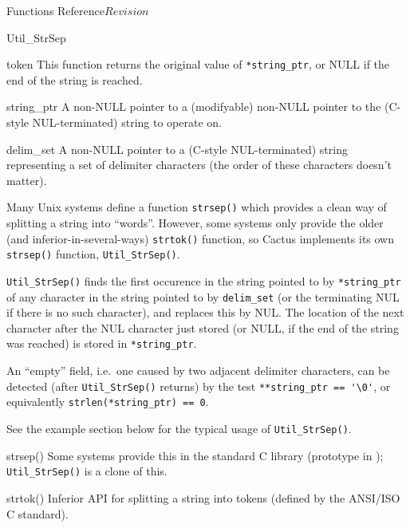 \begin{cactuspart}{ Functions Reference}{}{$Revision$}
\begin{FunctionDescription}{Util\_StrSep}
\begin{ResultSection}
\begin{Result}{token}
This function returns the original value of \verb|*string_ptr|,
or NULL if the end of the string is reached.
\end{Result}
\end{ResultSection}

\begin{ParameterSection}
\begin{Parameter}{string\_ptr}
A non-NULL pointer to a (modifyable) non-NULL pointer to the
(C-style NUL-terminated) string to operate on.
\end{Parameter}
\begin{Parameter}{delim\_set}
A non-NULL pointer to a (C-style NUL-terminated) string representing a
set of delimiter characters (the order of these characters doesn't matter).
\end{Parameter}
\end{ParameterSection}

\begin{Discussion}
Many Unix systems define a function \verb|strsep()| which provides
a clean way of splitting a string into ``words''.  However, some
systems only provide the older (and inferior-in-several-ways)
\verb|strtok()| function, so Cactus implements its own \verb|strsep()|
function, \verb|Util_StrSep()|.

\verb|Util_StrSep()| finds the first occurence in the string pointed
to by \verb|*string_ptr| of any character in the string pointed to by
\verb|delim_set| (or the terminating NUL if there is no such character),
and replaces this by NUL.  The location of the next character after the
NUL character just stored (or NULL, if the end of the string was reached)
is stored in \verb|*string_ptr|.

An ``empty'' field, i.e.\ one caused by two adjacent delimiter characters,
can be detected (after \verb|Util_StrSep()| returns) by the test
\verb|**string_ptr == '\0'|, or equivalently \verb|strlen(*string_ptr) == 0|.

See the example section below for the typical usage of \verb|Util_StrSep()|.
\end{Discussion}

\begin{SeeAlsoSection}
\begin{SeeAlso}{strsep()}
Some systems provide this in the standard C library
(prototype in ); \verb|Util_StrSep()| is a clone of this.
\end{SeeAlso}
\begin{SeeAlso}{strtok()}
Inferior API for splitting a string into tokens
(defined by the ANSI/ISO C standard).
\end{SeeAlso}
\end{SeeAlsoSection}


\end{FunctionDescription}
\end{cactuspart}
